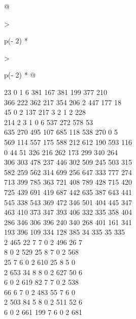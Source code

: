 \begin{question}
\begin{longtable}[]{@{}

  >{\raggedright\arraybackslash}p{(\columnwidth - 2\tabcolsep) * }

  >{\raggedright\arraybackslash}p{(\columnwidth - 2\tabcolsep) * }@{}}
\begin{minipage}[t]{\linewidth}
23 0 1 6 381 167 381 199 377 210\\

366 222 362 217 354 206 2 447 177 18\\

45 0 2 137 217 3 2 1 2 228\\

214 2 3 1 0 6 537 272 578 53\\

635 270 495 107 685 118 538 270 0 5\\

569 114 557 175 588 212 612 190 593 116\\

0 44 51 326 216 262 173 299 340 264\\

306 303 478 237 446 302 509 245 503 315\\

582 259 562 314 699 256 647 333 777 274\\

713 399 785 363 721 408 789 428 715 420\\

725 439 691 419 687 442 635 387 643 441\\

545 338 543 369 472 346 501 404 445 347\\

463 410 373 347 393 406 332 335 358 404\\

286 346 306 396 240 340 268 401 161 341\\

193 396 109 334 128 385 34 335 35 335\\

2 465 22 7 7 0 2 496 26 7\\

8 0 2 529 25 8 7 0 2 568\\

25 7 6 0 2 610 25 8 5 0\\

2 653 34 8 8 0 2 627 50 6\\

6 0 2 619 82 7 7 0 2 538\\

66 6 7 0 2 483 55 7 6 0\\

2 503 84 5 8 0 2 511 52 6\\

6 0 2 661 199 7 6 0 2 681\\


\end{minipage}
\end{longtable}
\end{question}
